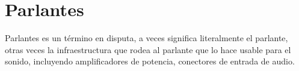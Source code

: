 \documentclass[../candidatura.tex]{subfiles}
\begin{document}
\esborrador

\section{Parlantes}

Parlantes es un término en disputa, a veces significa literalmente el parlante, otras veces la infraestructura que rodea al parlante que lo hace usable para el sonido, incluyendo amplificadores de potencia, conectores de entrada de audio.

\newpage
\end{document}
